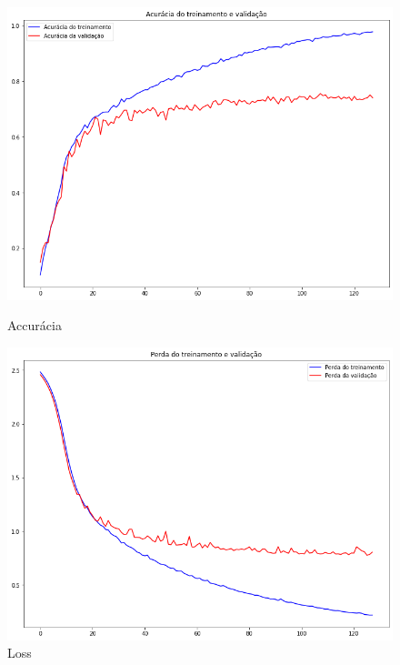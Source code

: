 \documentclass[12pt]{article}
\begin{document}
\begin{figure}[!htb]
  \begin{minipage}{.47\textwidth}
    \centering
    \includegraphics[width=1.1\linewidth]{experiments/lenet5_noaug_128/accuracy.png}
    \caption{Accurácia}\label{fig:experiment_lenet5_noaug_128_accuracy}
  \end{minipage}\hfill
  \begin{minipage}{.47\textwidth}
    \centering
    \includegraphics[width=1.1\linewidth]{experiments/lenet5_noaug_128/loss.png}
    \caption{Loss}\label{fig:experiment_lenet5_noaug_128_loss}
  \end{minipage}
\end{figure}
\end{document}
